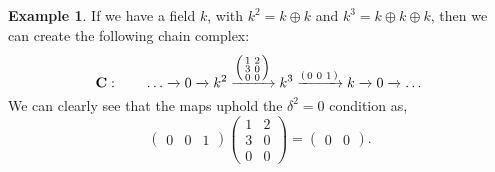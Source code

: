 \documentclass[11.5pt, twoside, a4paper, titlepage]{report}
\theoremstyle{definition}
\newtheorem{eg}[mydef]{Example}
\theoremstyle{plain}
\begin{document}
\begin{eg}
If we have a field $k$, with $k^2=k\oplus k$ and $k^3=k\oplus k\oplus k$, then we can create the following chain complex:
\begin{equation*}
\mathbf{C}: \qquad \dots \xrightarrow{} 0 \xrightarrow{} k^2 \xrightarrow{\Bigl(\begin{smallmatrix}1&2\\ 3&0\\ 0&0 \end{smallmatrix}\Bigr)} k^3 \xrightarrow{(\begin{smallmatrix}0 & 0 &1\end{smallmatrix})} k \xrightarrow{} 0 \xrightarrow{}\dots
\end{equation*}
We can clearly see that the maps uphold the $\delta^2=0$ condition as,
\begin{equation*}
\begin{pmatrix}0 & 0 &1
\end{pmatrix}
\begin{pmatrix}
1 & 2 \\
3 & 0\\
0 & 0
\end{pmatrix}
=\begin{pmatrix}
0 & 0
\end{pmatrix}.
\end{equation*}
\end{eg}
\end{document}
